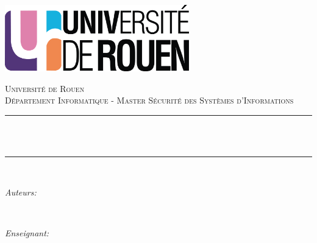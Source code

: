 \begin{titlepage}

\thispagestyle{empty}
\setcounter{page}{0}
\newcommand{\HRule}{\rule{\linewidth}{0.5mm}} %


\includegraphics[width=8cm]{title/logo.png}\\[1cm] %
 

\center %


\textsc{\Large Université de Rouen}\\[0.5cm] %
\textsc{\large Département Informatique - Master Sécurité des Systèmes d'Informations}\\[0.5cm] %

\makeatletter
\HRule \\[0.4cm]
{ \huge \bfseries \@title}\\[0.4cm] %
\HRule \\[1.5cm]
 

\begin{minipage}{0.4\textwidth}
\begin{flushleft} \large
\emph{Auteurs:}\\
\@author %
\end{flushleft}
\end{minipage}
~
\begin{minipage}{0.4\textwidth}
\begin{flushright} \large
\emph{Enseignant:} \\
\client %
\end{flushright}
\end{minipage}\\[6cm]
\makeatother


\end{titlepage}
